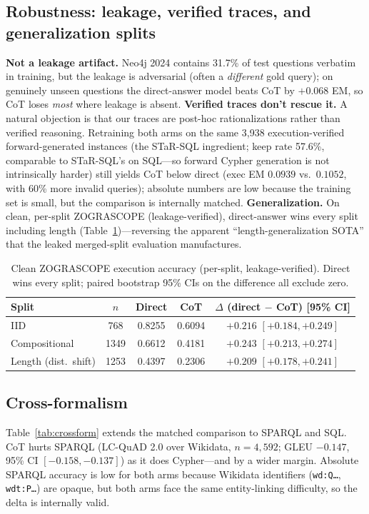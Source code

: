 \documentclass[11pt]{article}
\begin{document}
\subsection{Robustness: leakage, verified traces, and generalization splits}
\label{sec:robust}
\textbf{Not a leakage artifact.} Neo4j 2024 contains 31.7\% of test questions verbatim in training,
but the leakage is adversarial (often a \emph{different} gold query); on genuinely unseen questions
the direct-answer model beats CoT by $+0.068$ EM, so CoT loses \emph{most} where leakage is absent.
\textbf{Verified traces don't rescue it.} A natural objection is that our traces are post-hoc
rationalizations rather than verified reasoning. Retraining both arms on the same 3{,}938
execution-verified forward-generated instances (the STaR-SQL ingredient; keep rate 57.6\%, comparable
to STaR-SQL's on SQL---so forward Cypher generation is not intrinsically harder) still yields CoT
below direct (exec EM $0.0939$ vs.\ $0.1052$, with 60\% more invalid queries); absolute numbers are
low because the training set is small, but the comparison is internally matched.
\textbf{Generalization.} On clean, per-split ZOGRASCOPE (leakage-verified), direct-answer wins every
split including length (Table~\ref{tab:zog})---reversing the apparent ``length-generalization
SOTA'' that the leaked merged-split evaluation manufactures.

\begin{table}[t]\centering
\caption{Clean ZOGRASCOPE execution accuracy (per-split, leakage-verified). Direct wins every split;
paired bootstrap 95\% CIs on the difference all exclude zero.}
\label{tab:zog}
\begin{tabular}{lcccc}
\toprule
Split & $n$ & Direct & CoT & $\Delta$ (direct $-$ CoT) [95\% CI] \\
\midrule
IID            & 768  & 0.8255 & 0.6094 & $+0.216$ \; $[+0.184, +0.249]$ \\
Compositional  & 1349 & 0.6612 & 0.4181 & $+0.243$ \; $[+0.213, +0.274]$ \\
Length (dist.\ shift) & 1253 & 0.4397 & 0.2306 & $+0.209$ \; $[+0.178, +0.241]$ \\
\bottomrule
\end{tabular}
\end{table}

\subsection{Cross-formalism}
\label{sec:crossform}
Table~\ref{tab:crossform} extends the matched comparison to SPARQL and SQL. CoT hurts SPARQL
(LC-QuAD 2.0 over Wikidata, $n{=}4{,}592$; GLEU $-0.147$, 95\% CI $[-0.158, -0.137]$) as it does
Cypher---and by a wider margin. Absolute SPARQL accuracy is low for both arms because Wikidata
identifiers (\texttt{wd:Q\ldots}, \texttt{wdt:P\ldots}) are opaque, but both arms face the same
entity-linking difficulty, so the delta is internally valid.
\end{document}
